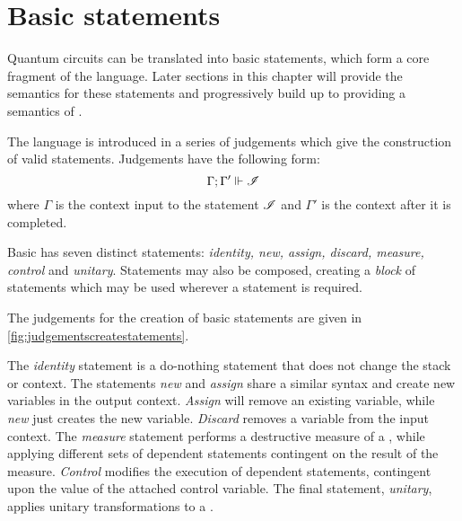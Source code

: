 \section{Basic \protect{\lqpl} statements}\label{sec:sembasiclqpl}
Quantum circuits can be translated into basic \lqpl{} statements, which
 form a core fragment of the \lqpl{}
language.  Later sections in this chapter will provide the semantics
for these statements and progressively build up to 
providing a semantics of \lqpl.

The language is introduced in a series of judgements which give
the construction of valid \lqpl{} statements.  Judgements have
the following form:
\[\Gamma ; \Gamma' \Vdash \mathscr{I} \]
where $\Gamma$ is the context input to the 
statement $\mathscr{I}$ and $\Gamma'$ is the context
after it is completed.

Basic \lqpl{} has seven distinct statements: 
\emph{identity, new, assign, discard, measure, control} and \emph{unitary}. 
Statements may also be composed, creating a \emph{block} of 
statements which may be used wherever a statement is required.


The  judgements for the creation of basic \lqpl{} statements are given in 
\vref{fig:judgementscreatestatements}.

The \emph{identity} statement is a do-nothing statement that does
not change the stack or context. The statements \emph{new} and
\emph{assign} share a similar syntax and create new variables in the output
context. \emph{Assign} will remove an existing variable, while  \emph{new}
just creates the new variable. \emph{Discard} removes a variable from the
input context. The \emph{measure} statement performs a destructive 
measure of a \qbit, while applying different sets of dependent statements
contingent on the result of the measure. \emph{Control} modifies the
execution of dependent statements, contingent upon the value of the
attached control variable. The final statement, \emph{unitary}, applies
unitary transformations to a \qbit.

